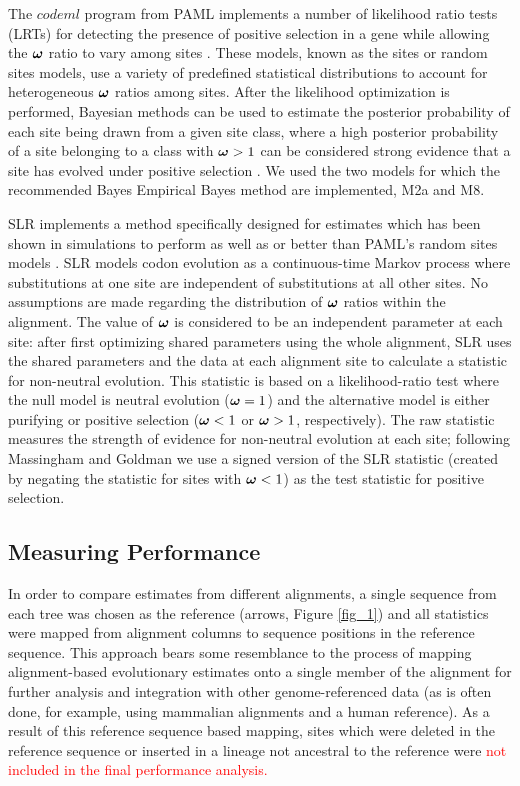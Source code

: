\documentclass{article}
\begin{document}
The $codeml$ program from PAML implements a number of likelihood ratio
tests (LRTs) for detecting the presence of positive selection in a
gene while allowing the $\bm{\omega}$ ratio to vary among sites
\citep{Yang2000CodonSubstitution}. These models, known as the sites or
random sites models, use a variety of predefined statistical
distributions to account for heterogeneous $\bm{\omega}$ ratios among sites. After
the likelihood optimization is performed, Bayesian methods can be used
to estimate the posterior probability of each site being drawn from a
given site class, where a high posterior probability of a site
belonging to a class with $\bm{\omega}>1$ can be considered strong
evidence that a site has evolved under positive selection
\citep{Yang2005Bayes}. We used the two models for which the
recommended Bayes Empirical Bayes method are implemented, M2a and M8.

SLR implements a method specifically designed for \sw estimates which
has been shown in simulations to perform as well as or better than
PAML's \sw random sites models \citep{Massingham2005Detecting}. SLR
models codon evolution as a continuous-time Markov process where
substitutions at one site are independent of substitutions at all
other sites. No assumptions are made regarding the
distribution of $\bm{\omega}$ ratios within the alignment. The value of
$\bm{\omega}$ is considered to be an independent parameter at each site:
after first optimizing shared parameters using the whole alignment,
SLR uses the shared parameters and the data at each alignment site to
calculate a \sw statistic for non-neutral evolution. This statistic is
based on a likelihood-ratio test where the null model is neutral
evolution ($\bm{\omega}=1$) and the alternative model is either purifying or
positive selection ($\bm{\omega}<1$ or $\bm{\omega}>1$, respectively). The raw
statistic measures the strength of evidence for non-neutral evolution
at each site; following Massingham and Goldman
\citeyearpar{Massingham2005Detecting} we use a signed version of the
SLR statistic (created by negating the statistic for sites with
$\bm{\omega}<1$) as the test statistic for positive selection.

\subsection*{Measuring Performance}

In order to compare \sw estimates from different alignments, a single
sequence from each tree was chosen as the reference (arrows, Figure
\ref{fig_1}) and all \sw statistics were mapped from alignment columns
to sequence positions in the reference sequence. This approach bears
some resemblance to the process of mapping alignment-based
evolutionary estimates onto a single member of the alignment for
further analysis and integration with other genome-referenced data (as
is often done, for example, using mammalian alignments and a human
reference). As a result of this reference sequence based mapping,
sites which were deleted in the reference sequence or inserted in a
lineage not ancestral to the reference were \textcolor{red}{not
  included in the final performance analysis.}
\end{document}
